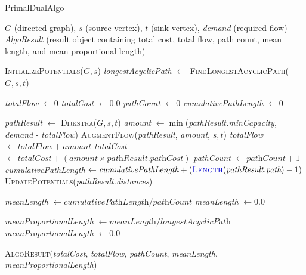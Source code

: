 \documentclass{article}
\begin{document}
\begin{algorithm}[H]
\caption{\textcolor{keywordcolor}{PrimalDualAlgo}}
\begin{algorithmic}[1]
\State {} $G$ (directed graph), $s$ (source vertex), $t$ (sink vertex), \textit{demand} (required flow)
\State {} \textit{AlgoResult} (result object containing total cost, total flow, path count, mean length, and mean proportional length)

\State \textcolor{identifiercolor}{\textsc{InitializePotentials}}($G, s$)
\State \textit{longestAcyclicPath} $\gets$ \textcolor{identifiercolor}{\textsc{FindLongestAcyclicPath}}($G, s, t$)

\State \textit{totalFlow} $\gets 0$
\State \textit{totalCost} $\gets 0.0$
\State \textit{pathCount} $\gets 0$
\State \textit{cumulativePathLength} $\gets 0$

    \State \textit{pathResult} $\gets$ \textcolor{identifiercolor}{\textsc{Dijkstra}}($G, s, t$)
    \State \textit{amount} $\gets \min$(\textit{pathResult.minCapacity}, \textit{demand} - \textit{totalFlow})
    \State \textcolor{identifiercolor}{\textsc{AugmentFlow}}(\textit{pathResult}, \textit{amount}, $s, t$)
    \State \textit{totalFlow} $\gets \textit{totalFlow} + \textit{amount}$
    \State \textit{totalCost} $\gets \textit{totalCost} + (\textit{amount} \times \textit{pathResult.pathCost})$
    \State \textit{pathCount} $\gets \textit{pathCount} + 1$
    \State \textit{cumulativePathLength} $\gets \textit{cumulativePathLength} + (\textcolor{identifiercolor}{\textsc{Length}}(\textit{pathResult.path}) - 1)$
    \State \textcolor{identifiercolor}{\textsc{UpdatePotentials}}(\textit{pathResult.distances})
\EndWhile

    \State \textit{meanLength} $\gets \textit{cumulativePathLength} / \textit{pathCount}$
\Else
    \State \textit{meanLength} $\gets 0.0$
\EndIf

    \State \textit{meanProportionalLength} $\gets \textit{meanLength} / \textit{longestAcyclicPath}$
\Else
    \State \textit{meanProportionalLength} $\gets 0.0$
\EndIf

\State \Return \textcolor{identifiercolor}{\textsc{AlgoResult}}(\textit{totalCost}, \textit{totalFlow}, \textit{pathCount}, \textit{meanLength}, \textit{meanProportionalLength})
\end{algorithmic}
\end{algorithm}
\end{document}
